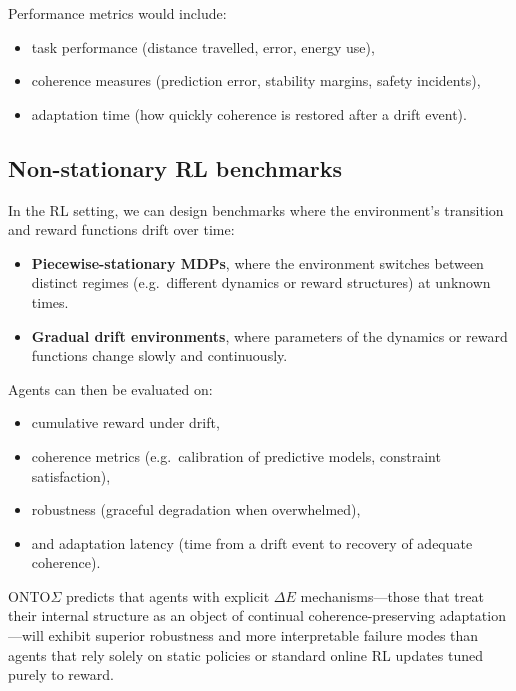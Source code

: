 \documentclass[12pt,a4paper]{report}
\begin{document}
Performance metrics would include:

\begin{itemize}[leftmargin=2em]
    \item task performance (distance travelled, error, energy use),
    \item coherence measures (prediction error, stability margins, safety incidents),
    \item adaptation time (how quickly coherence is restored after a drift event).
\end{itemize}

\subsection*{Non-stationary RL benchmarks}

In the RL setting, we can design benchmarks where the environment's transition and reward functions drift over time:

\begin{itemize}[leftmargin=2em]
    \item \textbf{Piecewise-stationary MDPs}, where the environment switches between distinct regimes (e.g.\ different dynamics or reward structures) at unknown times.
    \item \textbf{Gradual drift environments}, where parameters of the dynamics or reward functions change slowly and continuously.
\end{itemize}

Agents can then be evaluated on:

\begin{itemize}[leftmargin=2em]
    \item cumulative reward under drift,
    \item coherence metrics (e.g.\ calibration of predictive models, constraint satisfaction),
    \item robustness (graceful degradation when overwhelmed),
    \item and adaptation latency (time from a drift event to recovery of adequate coherence).
\end{itemize}

ONTO$\Sigma$ predicts that agents with explicit $\Delta E$ mechanisms---those that treat their internal structure as an object of continual coherence-preserving adaptation---will exhibit superior robustness and more interpretable failure modes than agents that rely solely on static policies or standard online RL updates tuned purely to reward.
\end{document}
